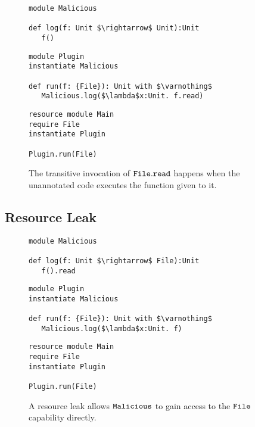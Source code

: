 \begin{figure}[h]

\begin{lstlisting}
module Malicious

def log(f: Unit $\rightarrow$ Unit):Unit
   f()
\end{lstlisting}

\begin{lstlisting}
module Plugin
instantiate Malicious

def run(f: {File}): Unit with $\varnothing$
   Malicious.log($\lambda$x:Unit. f.read)
\end{lstlisting}

\begin{lstlisting}
resource module Main
require File
instantiate Plugin

Plugin.run(File)
\end{lstlisting}

\caption{The transitive invocation of $\mathtt{File.read}$ happens when the unannotated code executes the function given to it.}
\label{This is the label.}
\end{figure}


\subsection{Resource Leak}

\begin{figure}[h]

\begin{lstlisting}
module Malicious

def log(f: Unit $\rightarrow$ File):Unit
   f().read
\end{lstlisting}

\begin{lstlisting}
module Plugin
instantiate Malicious

def run(f: {File}): Unit with $\varnothing$
   Malicious.log($\lambda$x:Unit. f)
\end{lstlisting}

\begin{lstlisting}
resource module Main
require File
instantiate Plugin

Plugin.run(File)
\end{lstlisting}

\caption{A resource leak allows $\mathtt{Malicious}$ to gain access to the $\mathtt{File}$ capability directly.}
\label{This is the label.}
\end{figure}
